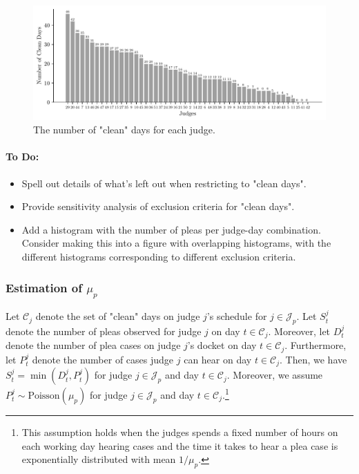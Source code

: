 \documentclass[11pt, oneside]{article}   	%
\theoremstyle{ModifiedStyle}
\begin{document}
		\begin{figure}[H]
			\centering
			\includegraphics[scale=0.75]{Figures/Judge_Clean_Days_Histogram}
			\vspace{-3mm}
			\caption{The number of "clean" days for each judge.}
			\label{Figure_Judge_Clean_Days_Histogram}
		\end{figure}

		\paragraph{To Do:}
		\begin{itemize}
			\item Spell out details of what's left out when restricting to "clean days".
			\item Provide sensitivity analysis of exclusion criteria for "clean days".
			\item Add a histogram with the number of pleas per judge-day combination. Consider making this into a figure with overlapping histograms, with the different histograms corresponding to different exclusion criteria.
		\end{itemize}

		\subsubsection{Estimation of $\mu_p$}
			\label{Sec:Estimation:Capacity_Estimation:Plea_Capacity}
			Let $\mathcal{C}_j$ denote the set of "clean" days on judge $j$'s schedule for $j\in\mathcal{J}_p$. Let $S^j_t$ denote the number of pleas observed for judge $j$ on day $t\in\mathcal{C}_j$. Moreover, let $D^j_t$ denote the number of plea cases on judge $j$'s docket on day $t\in\mathcal{C}_j$. Furthermore, let $P^j_t$ denote the number of cases judge $j$ can hear on day $t\in\mathcal{C}_j$. Then, we have $S^j_t = \min(D^j_t,P^j_t)$ for judge $j\in\mathcal{J}_p$ and day $t\in\mathcal{C}_j$. Moreover, we assume $P^j_t \sim \text{Poisson}(\mu_p)$ for judge $j\in\mathcal{J}_p$ and day $t\in\mathcal{C}_j$.\footnote{This assumption holds when the judges spends a fixed number of hours on each working day hearing cases and the time it takes to hear a plea case is exponentially distributed with mean $1/\mu_p$.}
\end{document}
